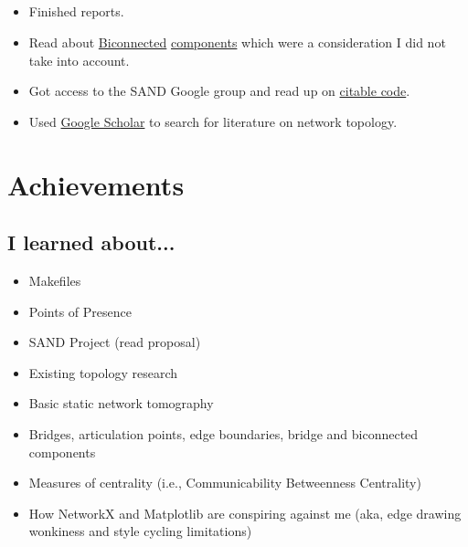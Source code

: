 \documentclass{weeklyreport}
\begin{document}
\subsection*{}

\begin{itemize}
	\item Finished reports.
	\item Read about \href{https://en.wikipedia.org/wiki/Biconnected_component}{Biconnected} \href{https://networkx.github.io/documentation/stable/reference/algorithms/generated/networkx.algorithms.components.biconnected_components.html}{components} which were a consideration I did not take into account.
	\item Got access to the SAND Google group and read up on \href{https://guides.github.com/activities/citable-code/}{citable code}.
	\item Used \href{https://scholar.google.com}{Google Scholar} to search for literature on network topology. 
\end{itemize}

\section*{Achievements}
\subsection*{I learned about...}
\begin{itemize}
	\item Makefiles
	\item Points of Presence
	\item SAND Project (read proposal)
	\item Existing topology research
	\item Basic static network tomography
	\item Bridges, articulation points, edge boundaries, bridge and biconnected components
	\item Measures of centrality (i.e., Communicability Betweenness Centrality)
	\item How NetworkX and Matplotlib are conspiring against me (aka, edge drawing wonkiness and style cycling limitations)
\end{itemize}
\end{document}
